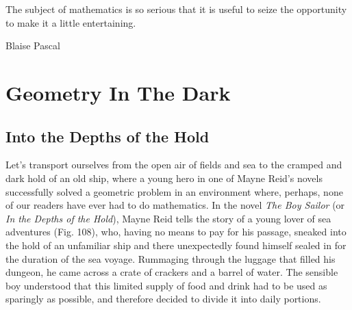 


\cleardoublepage
\vspace*{\fill}
\begin{center}
\epigraph{\begin{minipage}{0.4\pagewidth} \textsf{The subject of mathematics is so serious that it is useful to seize the opportunity to make it a little entertaining.}\end{minipage}}{Blaise Pascal}
\end{center}
\vspace*{\fill}

\thispagestyle{empty}



\chapter{Geometry In The Dark}
\label{ch-08}



\section{Into the Depths of the Hold}
\label{sec-8.1}

Let's transport ourselves from the open air of fields and sea to the cramped and dark hold of an old ship, where a young hero in one of Mayne Reid's novels successfully solved a geometric problem in an environment where, perhaps, none of our readers have ever had to do mathematics. In the novel \emph{The Boy Sailor} (or \emph{In the Depths of the Hold}), Mayne Reid tells the story of a young lover of sea adventures (Fig. 108), who, having no means to pay for his passage, sneaked into the hold of an unfamiliar ship and there unexpectedly found himself sealed in for the duration of the sea voyage. Rummaging through the luggage that filled his dungeon, he came across a crate of crackers and a barrel of water. The sensible boy understood that this limited supply of food and drink had to be used as sparingly as possible, and therefore decided to divide it into daily portions.

